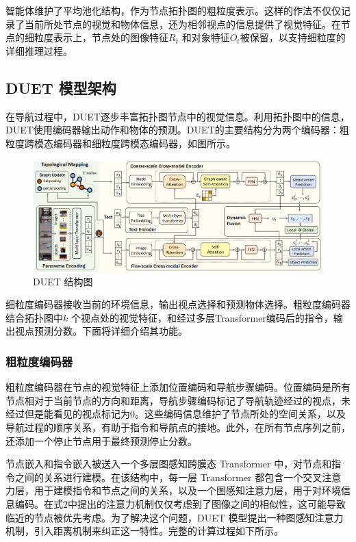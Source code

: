 \documentclass[bachelor]{thesis-uestc}
\begin{document}
智能体维护了平均池化结构，作为节点拓扑图的粗粒度表示。这样的作法不仅仅记录了当前所处节点的视觉和物体信息，还为相邻视点的信息提供了视觉特征。在节点的细粒度表示上，节点处的图像特征$R_t$ 和对象特征$O_t$被保留，以支持细粒度的详细推理过程。

\subsection{DUET 模型架构}

在导航过程中，DUET逐步丰富拓扑图节点中的视觉信息。利用拓扑图中的信息，DUET使用编码器输出动作和物体的预测。DUET的主要结构分为两个编码器：粗粒度跨模态编码器和细粒度跨模态编码器，如图所示。

\begin {figure}[h]
\centering %
\includegraphics[width=\textwidth]{0242-042816.png}
\caption{DUET 结构图} %
\label{duet}
\end {figure}

细粒度编码器接收当前的环境信息，输出视点选择和预测物体选择。粗粒度编码器结合拓扑图中$k$ 个视点处的视觉特征，和经过多层Transformer编码后的指令，输出视点预测分数。下面将详细介绍其功能。

\subsubsection{粗粒度编码器}

粗粒度编码器在节点的视觉特征上添加位置编码和导航步骤编码。位置编码是所有节点相对于当前节点的方向和距离，导航步骤编码标记了导航轨迹经过的视点，未经过但是能看见的视点标记为0。这些编码信息维护了节点所处的空间关系，以及导航过程的顺序关系，有助于指令和导航点的接地。此外，在所有节点序列之前，还添加一个停止节点用于最终预测停止分数。

节点嵌入和指令嵌入被送入一个多层图感知跨膜态 Transformer 中，对节点和指令之间的关系进行建模。在该结构中，每一层 Transformer 都包含一个交叉注意力层，用于建模指令和节点之间的关系，以及一个图感知注意力层，用于对环境信息编码。在式2中提出的注意力机制仅仅考虑到了图像之间的相似性，这可能导致临近的节点被优先考虑。为了解决这个问题，DUET 模型提出一种图感知注意力机制，引入距离机制来纠正这一特性。完整的计算过程如下所示。
\end{document}
